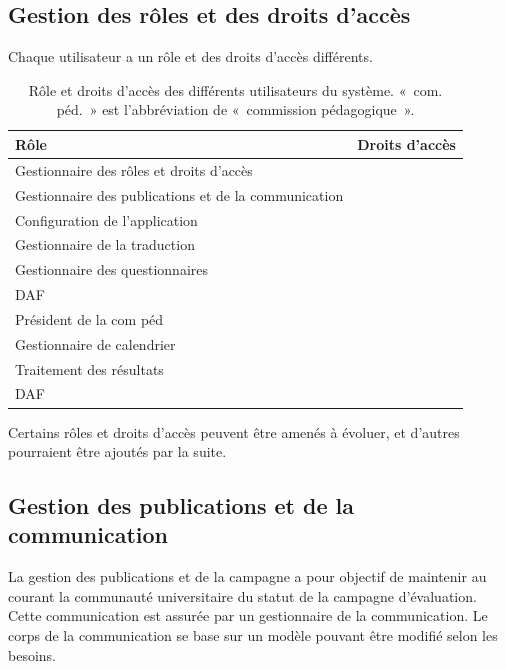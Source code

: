 \documentclass[a4paper,11pt]{report}
\begin{document}
\subsection{Gestion des rôles et des droits d'accès}
Chaque utilisateur a un rôle et des droits d'accès différents.

\begin{table}[ht]
\begin{tabularx}{\textwidth}{|X|l|} \hline
Rôle & Droits d'accès \\ \hline
Gestionnaire des rôles et droits d'accès & \\ \hline
Gestionnaire des publications et de la communication & \\ \hline
Configuration de l'application & \\ \hline
Gestionnaire de la traduction & \\ \hline
Gestionnaire des questionnaires & \\ \hline
DAF & \\ \hline
Président de la com péd & \\ \hline
Gestionnaire de calendrier & \\ \hline
Traitement des résultats & \\ \hline
DAF & \\ \hline

\end{tabularx}
\caption{Rôle et droits d'accès des différents utilisateurs du système. «~com. péd.~» est l'abbréviation de «~commission pédagogique~».}
\label{tab:role-droit}
\end{table}

Certains rôles et droits d'accès peuvent être amenés à évoluer, et d'autres pourraient être ajoutés par la suite.






\subsection{Gestion des publications et de la communication}
La gestion des publications et de la campagne a pour objectif de maintenir au courant la communauté universitaire du statut de la campagne d'évaluation.
Cette communication est assurée par un gestionnaire de la communication.
Le corps de la communication se base sur un modèle pouvant être modifié selon les besoins.
\end{document}
